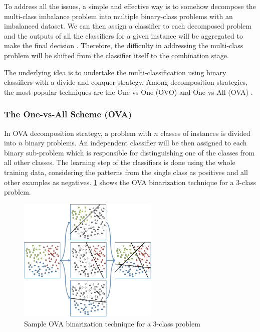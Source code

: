 To address all the issues, a simple and effective way is to somehow decompose the multi-class 
imbalance problem into multiple binary-class problems with an imbalanced dataset. We can 
then assign a classifier to each decomposed problem and the outputs of all the classifiers 
for a given instance will be aggregated to make the final decision \cite{kuncheva2014combining}. 
Therefore, the difficulty in addressing the multi-class problem will be shifted from the classifier 
itself to the combination stage. 

The underlying idea is to undertake the multi-classification using binary classifiers 
with a divide and conquer strategy. Among decomposition strategies, the most popular 
techniques are the One-vs-One (OVO) \cite{hastie1998classification,knerr1990single}
and One-vs-All (OVA) \cite{clark1991rule,anand1995efficient}.

\subsubsection{The One-vs-All Scheme (OVA)}
In OVA decomposition strategy, a problem with $n$ classes of instances is divided into $n$ 
binary problems. An independent classifier will be then assigned to each binary sub-problem which 
is responsible for distinguishing one of the classes from all other classes. The learning 
step of the classifiers is done using the whole training data, considering the patterns from 
the single class as positives and all other examples as negatives. \ref{fig:ova} shows the OVA 
binarization technique for a 3-class problem.

\begin{figure}[ht]
    \centering
    \includegraphics[width=0.60\textwidth]{figures/11ova.png}
    \caption{Sample OVA binarization technique for a 3-class problem \cite{fernandez_learning_2018}}
    \label{fig:ova}
\end{figure}

